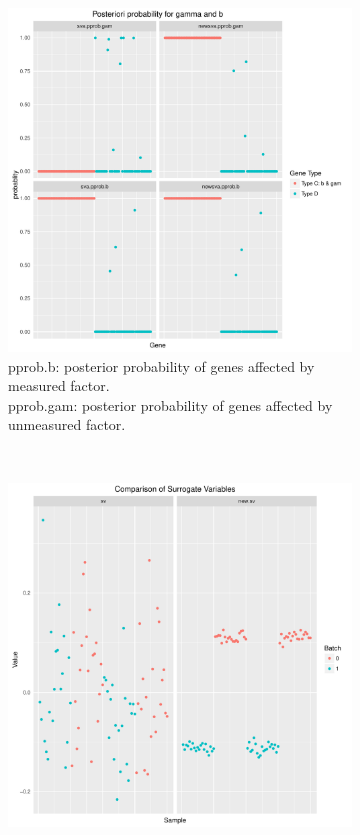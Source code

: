 \documentclass[11pt]{article}
\begin{document}
\begin{figure}[h!]
    \centering
    \begin{subfigure}[t]{0.4\textwidth}
    \centering
    \includegraphics[width = \textwidth]{figures/pprop4.pdf}
    \caption{pprob.b: posterior probability of genes affected by measured factor.\\
    pprob.gam: posterior probability of genes affected by unmeasured factor.}
    \label{fig:pprob1}
    \end{subfigure}
~    
    \begin{subfigure}[t]{0.4\textwidth}
    \centering
    \includegraphics[width = \textwidth]{figures/vector4.pdf}

\end{subfigure}
\end{figure}
\end{document}
